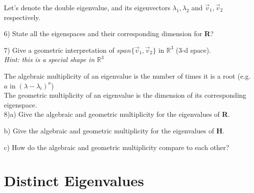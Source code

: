 \documentclass{article}
\begin{document}
\begin{flushleft}
\begin{flushleft}
\vspace{0.2in}

Let's denote the double eigenvalue, and its eigenvectors $\lambda_1 , \lambda_2$ and $\vec{v}_1 , \vec{v}_2$ respectively. 

\vspace{0.2in}



6) State all the eigenspaces and their corresponding dimension for \textbf{R}?

\vspace{2in}

7) Give a geometric interpretation of $span\{ \vec{v}_1 ,  \vec{v}_2 \}$ in $\mathbb{R}^3$ (3-d space). \\
\textit{Hint: this is a special shape in $\mathbb{R}^3$}

\vspace{1in}

The algebraic multiplicity of an eigenvalue is the number of times it is a root (e.g. $a$ in $(\lambda -\lambda_i)^a$)\\
The geometric multiplicity of an eigenvalue is the dimension of its corresponding eigenspace.\\
8)a) Give the algebraic and geometric multiplicity for the eigenvalues of \textbf{R}.

\vspace{1in}

b) Give the algebraic and geometric multiplicity for the eigenvalues of \textbf{H}.

\vspace{1in}

c) How do the algebraic and geometric multiplicity compare to each other?

\newpage

\section*{Distinct Eigenvalues}


\end{flushleft}
\end{flushleft}
\end{document}
